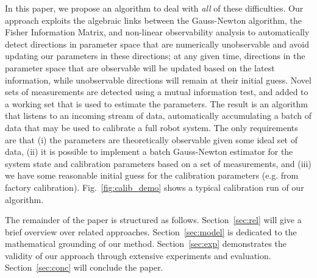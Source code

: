 In this paper, we propose an algorithm to deal with {\em all} of these
difficulties. Our approach exploits the algebraic links between the Gauss-Newton
algorithm, the Fisher Information Matrix, and non-linear observability analysis
to automatically detect directions in parameter space that are numerically
unobservable and avoid updating our parameters in these directions; at any given
time, directions in the parameter space that are observable will be updated
based on the latest information, while unobservable directions will remain at
their initial guess. Novel sets of measurements are detected using a mutual
information test, and added to a working set that is used to estimate the
parameters. The result is an algorithm that listens to an incoming stream of
data, automatically accumulating a batch of data that may be used to calibrate a
full robot system. The only requirements are that (i) the parameters are
theoretically observable given some ideal set of data, (ii) it is possible to
implement a batch Gauss-Newton estimator for the system state and calibration
parameters based on a set of measurements, and (iii) we have some reasonable
initial guess for the calibration parameters (e.g. from factory calibration).
Fig.~\ref{fig:calib_demo} shows a typical calibration run of our algorithm.

The remainder of the paper is structured as follows. Section~\ref{sec:rel}
will give a brief overview over related approaches. Section~\ref{sec:model} is
dedicated to the mathematical grounding of our method.
Section~\ref{sec:exp} demonstrates the validity of our approach through
extensive experiments and evaluation. Section~\ref{sec:conc} will conclude the
paper.
